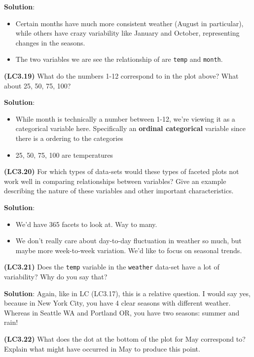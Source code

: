 \documentclass[12pt,]{krantz}
\providecommand{\tightlist}{%
  \setlength{\itemsep}{0pt}\setlength{\parskip}{0pt}}
\theoremstyle{definition}
\theoremstyle{definition}
\theoremstyle{definition}
\theoremstyle{remark}
\begin{document}
\textbf{Solution}:

\begin{itemize}
\tightlist
\item
  Certain months have much more consistent weather (August in
  particular), while others have crazy variability like January and
  October, representing changes in the seasons.
\item
  The two variables we are see the relationship of are \texttt{temp} and
  \texttt{month}.
\end{itemize}

\textbf{(LC3.19)} What do the numbers 1-12 correspond to in the plot
above? What about 25, 50, 75, 100?

\textbf{Solution}:

\begin{itemize}
\tightlist
\item
  While month is technically a number between 1-12, we're viewing it as
  a categorical variable here. Specifically an \textbf{ordinal
  categorical} variable since there is a ordering to the categories
\item
  25, 50, 75, 100 are temperatures
\end{itemize}

\textbf{(LC3.20)} For which types of data-sets would these types of
faceted plots not work well in comparing relationships between
variables? Give an example describing the nature of these variables and
other important characteristics.

\textbf{Solution}:

\begin{itemize}
\tightlist
\item
  We'd have 365 facets to look at. Way to many.
\item
  We don't really care about day-to-day fluctuation in weather so much,
  but maybe more week-to-week variation. We'd like to focus on seasonal
  trends.
\end{itemize}

\textbf{(LC3.21)} Does the \texttt{temp} variable in the
\texttt{weather} data-set have a lot of variability? Why do you say
that?

\textbf{Solution}: Again, like in LC (LC3.17), this is a relative
question. I would say yes, because in New York City, you have 4 clear
seasons with different weather. Whereas in Seattle WA and Portland OR,
you have two seasons: summer and rain!

\textbf{(LC3.22)} What does the dot at the bottom of the plot for May
correspond to? Explain what might have occurred in May to produce this
point.
\end{document}
